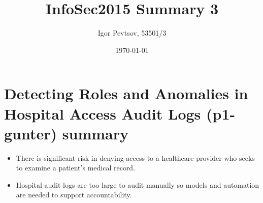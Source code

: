 \documentclass[14pt]{article}
\title{InfoSec2015 Summary 3}
\date{\today}
\author{Igor Pevtsov, 53501/3}
\begin{document}
  	\maketitle

	\section{Detecting Roles and Anomalies in Hospital Access Audit Logs (p1-gunter) summary}
	\begin{itemize}
	\item There is signiﬁcant risk in denying access to a healthcare provider who seeks to examine a patient’s medical record. 
	\item Hospital audit logs are too large to audit manually so models and automation are needed to support accountability. 
	\end{itemize}
\end{document}
